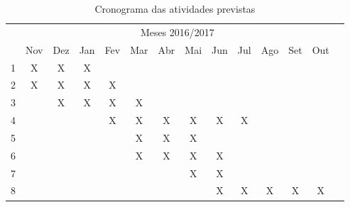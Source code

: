\begin{table}[!htpb]
\centering
\begin{small} 
  
\setlength{\tabcolsep}{6pt} 

\begin{tabular}{|c|c|c|c|c|c|c|c|c|c|c|c|c|c|}\hline
 & \multicolumn{12}{c|}{Meses 2016/2017}\\ \cline{2-13}
\raisebox{1.5ex}{Atividade} & Nov & Dez & Jan & Fev & Mar & Abr & Mai & Jun & Jul & Ago & Set & Out \\ \hline

1 & X & X & X &  &  &  &  &  &  &  &  & \\ \hline
2 & X & X & X & X &  &  &  &  &  &  &  & \\ \hline
3 &  & X & X & X & X &  &  &  &  &  &  & \\ \hline
4 &  &  &  & X & X & X & X & X & X &  &  & \\ \hline
5 &  &  &  &  & X & X & X &  &  &  &  & \\ \hline
6 &  &  &  &  & X & X & X & X &  &  &  & \\ \hline
7 &  &  &  &  &  &  & X & X &  &  &  & \\ \hline
8 &  &  &  &  &  &  &  & X & X & X & X & X \\ \hline

\end{tabular} 
\end{small}
\caption{Cronograma das atividades previstas}
\label{tab:cronograma_proposto}
\end{table}
